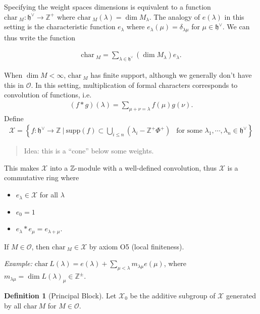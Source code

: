 \documentclass[11pt]{scrartcl}
\theoremstyle{definition}
\theoremstyle{theorem}
\theoremstyle{proof}
\theoremstyle{definition}
\newtheorem{definition}{Definition}[theorem]
\theoremstyle{break}
\theoremstyle{problem}
\providecommand{\tightlist}{%
  \setlength{\itemsep}{0pt}\setlength{\parskip}{0pt}}
\DeclarePairedDelimiter\qty{(}{)}
\renewcommand{\qty}[1]{{\left(  {#1} \right)}}
\newcommand{\ZZ}[0]{{\mathbb{Z}}}
\newcommand{\ch}[0]{\mathrm{char}~}
\newcommand{\dash}[0]{{\hbox{-}}}
\newcommand{\dual}[0]{^\vee}
\newcommand{\lieh}[0]{{\mathfrak{h}}}
\newcommand{\OO}[0]{{\mathcal{O}}}
\newcommand{\mcx}[0]{{\mathcal{X}}}
\newcommand{\suchthat}[0]{{~\mathrel{\Big|}~}}
\newcommand{\supp}[0]{{\mathrm{supp}}}
\newcommand{\theset}[1]{\left\{{#1}\right\}}
\newcommand{\union}[0]{\bigcup}
\renewcommand{\to}[0]{\longrightarrow}
\begin{document}
Specifying the weight spaces dimensions is equivalent to a function
\(\ch_M: \lieh\dual \to \ZZ^+\) where
\(\ch_M(\lambda) = \dim M_\lambda\). The analogy of \(e(\lambda)\) in
this setting is the characteristic function \(e_\lambda\) where
\(e_\lambda(\mu) = \delta_{\lambda \mu}\) for \(\mu \in \lieh\dual\). We
can thus write the function

\begin{align*}
\ch_M = \sum_{\lambda \in \lieh\dual} \qty{ \dim M_\lambda } e_\lambda
.\end{align*}

When \(\dim M < \infty\), \(\ch_M\) has finite support, although we
generally don't have this in \(\OO\). In this setting, multiplication of
formal characters corresponds to convolution of functions, i.e.~
\begin{align*}(f\ast g)(\lambda) = \sum_{\mu + \nu = \lambda} f(\mu) g(\nu).\end{align*}
Define
\begin{align*}
\mcx = \theset{f: \lieh\dual \to \ZZ \suchthat \supp(f) \subset \union_{i\leq n} \qty{ \lambda_i - \ZZ^+ \Phi^+  }  ~~\text{ for some } \lambda_1, \cdots, \lambda_n \in \lieh\dual }
\end{align*}

\begin{quote}
Idea: this is a ``cone'' below some weights.
\end{quote}

This makes \(\mcx\) into a \(\ZZ\dash\)module with a well-defined
convolution, thus \(\mcx\) is a commutative ring where

\begin{itemize}
\tightlist
\item
  \(e_\lambda \in \mcx\) for all \(\lambda\)
\item
  \(e_0 = 1\)
\item
  \(e_\lambda \ast e_\mu = e_{\lambda + \mu}\).
\end{itemize}

If \(M\in \OO\), then \(\ch_M \in \mcx\) by axiom O5 (local finiteness).

\emph{Example:}
\(\ch L(\lambda) = e(\lambda) + \sum_{\mu < \lambda} m_{\lambda \mu} e(\mu)\),
where \(m_{\lambda \mu} = \dim L(\lambda)_{\mu} \in \ZZ^\pm\).

\begin{definition}[Principal Block]

Let \(\mcx_0\) be the additive subgroup of \(\mcx\) generated by all
\(\ch M\) for \(M \in \OO\).\end{definition}
\end{document}
